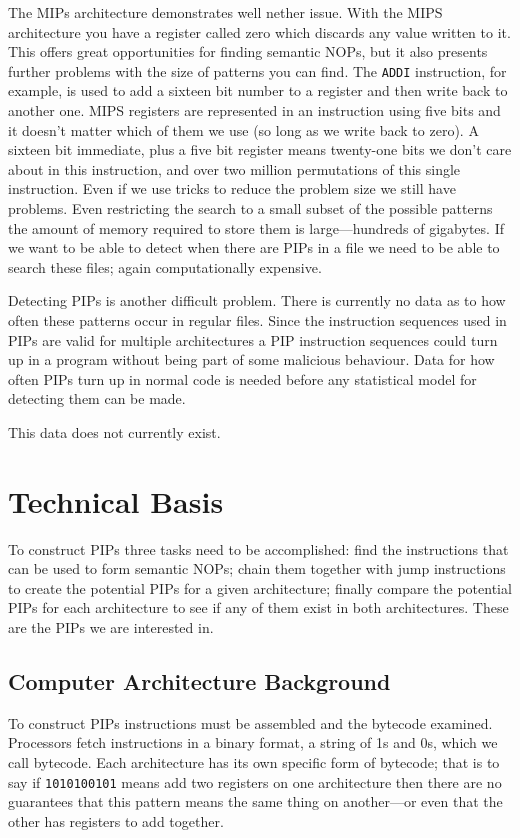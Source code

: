 \documentclass[10pt,]{book}
\begin{document}
The MIPs architecture demonstrates well nether issue. With the MIPS
architecture you have a register called zero which discards any value
written to it. This offers great opportunities for finding semantic
NOPs, but it also presents further problems with the size of patterns
you can find. The \lstinline!ADDI! instruction, for example, is used to
add a sixteen bit number to a register and then write back to another
one. MIPS registers are represented in an instruction using five bits
and it doesn't matter which of them we use (so long as we write back to
zero). A sixteen bit immediate, plus a five bit register means
twenty-one bits we don't care about in this instruction, and over two
million permutations of this single instruction. Even if we use tricks
to reduce the problem size we still have problems. Even restricting the
search to a small subset of the possible patterns the amount of memory
required to store them is large---hundreds of gigabytes. If we want to
be able to detect when there are PIPs in a file we need to be able to
search these files; again computationally expensive.

Detecting PIPs is another difficult problem. There is currently no data
as to how often these patterns occur in regular files. Since the
instruction sequences used in PIPs are valid for multiple architectures
a PIP instruction sequences could turn up in a program without being
part of some malicious behaviour. Data for how often PIPs turn up in
normal code is needed before any statistical model for detecting them
can be made.

This data does not currently exist.

\chapter{Technical Basis}

To construct PIPs three tasks need to be accomplished: find the
instructions that can be used to form semantic NOPs; chain them together
with jump instructions to create the potential PIPs for a given
architecture; finally compare the potential PIPs for each architecture
to see if any of them exist in both architectures. These are the PIPs we
are interested in.

\section{Computer Architecture Background}

To construct PIPs instructions must be assembled and the bytecode
examined. Processors fetch instructions in a binary format, a string of
1s and 0s, which we call bytecode. Each architecture has its own
specific form of bytecode; that is to say if \lstinline!1010100101!
means add two registers on one architecture then there are no guarantees
that this pattern means the same thing on another---or even that the
other has registers to add together.
\end{document}

